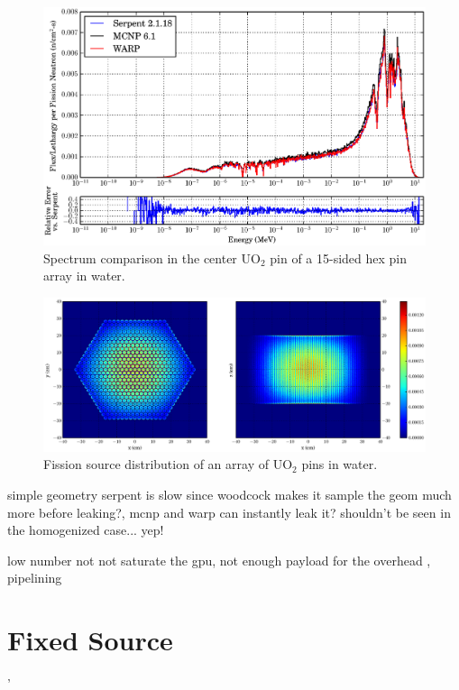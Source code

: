 \begin{figure}[h!] 
\centering
\includegraphics[width=\textwidth]{graphics/finalresults/assembly_spec-6.eps}
\caption{Spectrum comparison in the center UO$_2$ pin of a 15-sided hex pin array in water. \label{assembly_spec} }
\end{figure}

\begin{figure}[h!]
\centering
\includegraphics[width=\textwidth,trim= 2cm 0cm 2cm 0cm]{graphics/finalresults/assembly_fiss-6.eps}
\caption{Fission source distribution of an array of UO$_2$ pins in water. \label{assembly_fiss} }
\end{figure}

simple geometry serpent is slow since woodcock makes it sample the geom much more before leaking?, mcnp and warp can instantly leak it?  shouldn't be seen in the homogenized case... yep!

low number not not saturate the gpu, not enough payload for the overhead , pipelining

\section{Fixed Source}'

